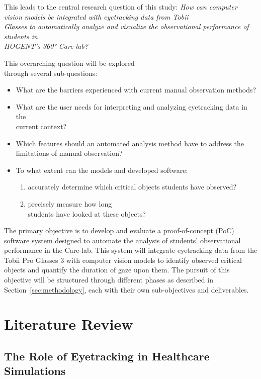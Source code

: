 \documentclass[english]{hogent-article}
\begin{document}
This leads to the central research question of this study:
\textit{How can computer vision models be integrated with eyetracking data from Tobii\\ Glasses to automatically analyze and visualize the observational performance of students in\\ HOGENT's 360° Care-lab?}

This overarching question will be explored\\ through several sub-questions:
\begin{itemize}
  \item What are the barriers experienced with current manual observation methods?
  \item What are the user needs for interpreting and analyzing eyetracking data in the\\ current context?
  \item Which features should an automated analysis method have to address the limitations of manual observation?
  \item To what extent can the models and developed software:
    \begin{enumerate}
      \item accurately determine which critical objects students have observed?
      \item precisely measure how long\\ students have looked at these objects?
    \end{enumerate}
\end{itemize}

The primary objective is to develop and evaluate a proof-of-concept (PoC) software system designed to automate the analysis of students' observational performance in the Care-lab.
This system will integrate eyetracking data from the Tobii Pro Glasses 3 with computer vision models to identify observed critical objects and quantify the duration of gaze upon them.
The pursuit of this objective will be structured through different phases as described in Section~\ref{sec:methodology}, each with their own sub-objectives and deliverables.

\section{Literature Review}
\label{sec:literature-review}

\subsection{The Role of Eyetracking in Healthcare Simulations}
\end{document}

